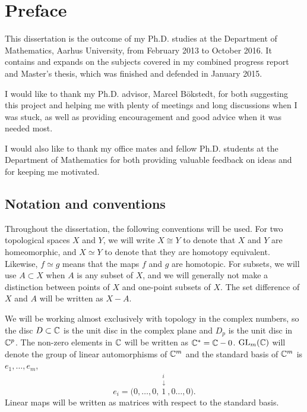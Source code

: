 \chapter{Preface} 



This dissertation is the outcome of my Ph.D. studies at the Department
of Mathematics, Aarhus University, from February 2013 to October
2016. It contains and expands on the subjects covered in my combined
progress report and Master's thesis, which was finished and defended
in January 2015.

I would like to thank my Ph.D. advisor, Marcel B\"okstedt, for both
suggesting this project and helping me with plenty of meetings and long
discussions when I was stuck, as well as providing
encouragement and good advice when it was needed most.

I would also like to thank my office mates and fellow Ph.D. students
at the Department of Mathematics
for both providing valuable feedback on ideas and for keeping me
motivated.


\section{Notation and conventions}

Throughout the dissertation, the following conventions will be used.
For two topological spaces $X$ and $Y$, we will write $X \cong Y$ to
denote that $X$ and $Y$ are homeomorphic, and $X\simeq Y$ to denote
that they are homotopy equivalent. Likewise, $f \simeq g$ means that
the maps $f$ and $g$ are homotopic. For subsets, we will use $A
\subset X$ when $A$ is any subset of $X$, and we will generally not
make a distinction between points of $X$ and one-point subsets of
$X$. The set difference of $X$ and $A$ will be written as $X-A$.

We will be working almost exclusively with topology in the complex
numbers,
so the disc $D\subset\mathbb{C}$ is the unit disc in the complex plane and
$D_p$ is the unit disc in $\mathbb{C}^p$. The non-zero elements in $\mathbb{C}$ will
be written as $\mathbb{C}^* = \mathbb{C} - 0$. $\operatorname{GL}_m(\mathbb{C})$ will denote the group of
linear automorphisms of $\mathbb{C}^m$ and the standard basis of $\mathbb{C}^m$ is
$e_1,\dots,e_m$,
\[ e_i =
\big(0, \dots, 0, \overset{\substack{i\\\downarrow}}{1}, 0\dots,
0\big).\]
Linear maps will be written as matrices with respect
to the standard basis.

